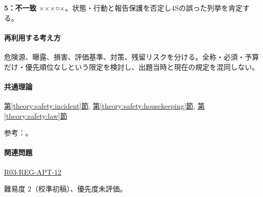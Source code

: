 \noindent\textbf{5：不一致} ×××○×。状態・行動と報告保護を否定し4Sの誤った列挙を肯定する。\par

\paragraph{再利用する考え方} 危険源、曝露、損害、評価基準、対策、残留リスクを分ける。全称・必須・予算だけ・優先順位なしという限定を検討し、出題当時と現在の規定を混同しない。

\paragraph{共通理論} \hyperref[theory:safety:incident]{第\ref*{theory:safety:incident}節}, \hyperref[theory:safety:housekeeping]{第\ref*{theory:safety:housekeeping}節}, \hyperref[theory:safety:law]{第\ref*{theory:safety:law}節}

\par 参考：\cite{saf_welfare,saf_4s,saf_chemqa}。

\paragraph{関連問題} \hyperref[q:r03-reg-apt-12]{R03-REG-APT-12}

\par 難易度 2（校準初稿）、優先度未評価。
